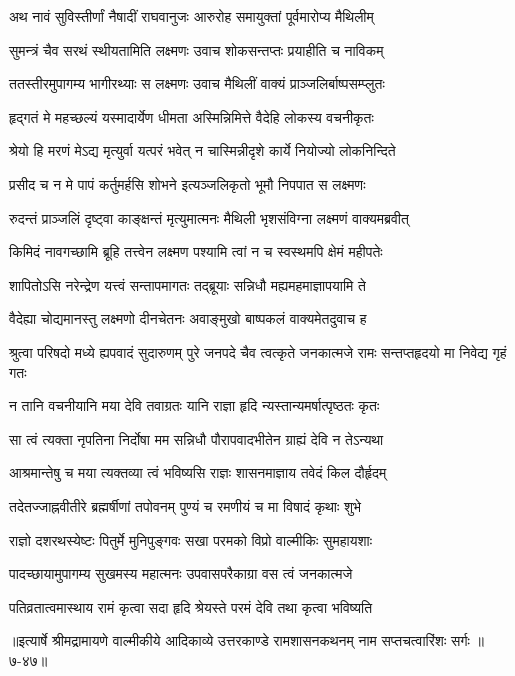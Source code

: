 
\twolineshloka
{अथ नावं सुविस्तीर्णां नैषादीं राघवानुजः}
{आरुरोह समायुक्तां पूर्वमारोप्य मैथिलीम्} %

\twolineshloka
{सुमन्त्रं चैव सरथं स्थीयतामिति लक्ष्मणः}
{उवाच शोकसन्तप्तः प्रयाहीति च नाविकम्} %

\twolineshloka
{ततस्तीरमुपागम्य भागीरथ्याः स लक्ष्मणः}
{उवाच मैथिलीं वाक्यं प्राञ्जलिर्बाष्पसम्प्लुतः} %

\twolineshloka
{हृद्गतं मे महच्छल्यं यस्मादार्येण धीमता}
{अस्मिन्निमित्ते वैदेहि लोकस्य वचनीकृतः} %

\twolineshloka
{श्रेयो हि मरणं मेऽद्य मृत्युर्वा यत्परं भवेत्}
{न चास्मिन्नीदृशे कार्ये नियोज्यो लोकनिन्दिते} %

\twolineshloka
{प्रसीद च न मे पापं कर्तुमर्हसि शोभने}
{इत्यञ्जलिकृतो भूमौ निपपात स लक्ष्मणः} %

\twolineshloka
{रुदन्तं प्राञ्जलिं दृष्ट्वा काङ्क्षन्तं मृत्युमात्मनः}
{मैथिली भृशसंविग्ना लक्ष्मणं वाक्यमब्रवीत्} %

\twolineshloka
{किमिदं नावगच्छामि ब्रूहि तत्त्वेन लक्ष्मण}
{पश्यामि त्वां न च स्वस्थमपि क्षेमं महीपतेः} %

\twolineshloka
{शापितोऽसि नरेन्द्रेण यत्त्वं सन्तापमागतः}
{तद्ब्रूयाः सन्निधौ मह्यमहमाज्ञापयामि ते} %

\twolineshloka
{वैदेह्या चोद्यमानस्तु लक्ष्मणो दीनचेतनः}
{अवाङ्मुखो बाष्पकलं वाक्यमेतदुवाच ह} %

\threelineshloka
{श्रुत्वा परिषदो मध्ये ह्यपवादं सुदारुणम्}
{पुरे जनपदे चैव त्वत्कृते जनकात्मजे}
{रामः सन्तप्तहृदयो मा निवेद्य गृहं गतः} %

\twolineshloka
{न तानि वचनीयानि मया देवि तवाग्रतः}
{यानि राज्ञा हृदि न्यस्तान्यमर्षात्पृष्ठतः कृतः} %

\twolineshloka
{सा त्वं त्यक्ता नृपतिना निर्दोषा मम सन्निधौ}
{पौरापवादभीतेन ग्राह्यं देवि न तेऽन्यथा} %

\twolineshloka
{आश्रमान्तेषु च मया त्यक्तव्या त्वं भविष्यसि}
{राज्ञः शासनमाज्ञाय तवेदं किल दौर्हृदम्} %

\twolineshloka
{तदेतज्जाह्नवीतीरे ब्रह्मर्षीणां तपोवनम्}
{पुण्यं च रमणीयं च मा विषादं कृथाः शुभे} %

\twolineshloka
{राज्ञो दशरथस्येष्टः पितुर्मे मुनिपुङ्गवः}
{सखा परमको विप्रो वाल्मीकिः सुमहायशाः} %

\twolineshloka
{पादच्छायामुपागम्य सुखमस्य महात्मनः}
{उपवासपरैकाग्रा वस त्वं जनकात्मजे} %

\twolineshloka
{पतिव्रतात्वमास्थाय रामं कृत्वा सदा हृदि}
{श्रेयस्ते परमं देवि तथा कृत्वा भविष्यति} %


॥इत्यार्षे श्रीमद्रामायणे वाल्मीकीये आदिकाव्ये उत्तरकाण्डे रामशासनकथनम् नाम सप्तचत्वारिंशः सर्गः ॥७-४७॥
